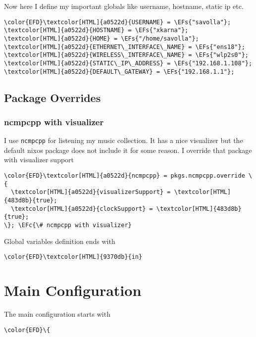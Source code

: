 \documentclass[14pt]{article}
\newcommand{\EFc}[1]{\textcolor{EFc}{#1}} %
\newcommand{\EFs}[1]{\textcolor{EFs}{#1}} %
\begin{document}
Now here I define my important globals like username, hostname, static ip etc.
\begin{Code}
\begin{Verbatim}
\color{EFD}\textcolor[HTML]{a0522d}{USERNAME} = \EFs{"savolla"};
\textcolor[HTML]{a0522d}{HOSTNAME} = \EFs{"xkarna"};
\textcolor[HTML]{a0522d}{HOME} = \EFs{"/home/savolla"};
\textcolor[HTML]{a0522d}{ETHERNET\_INTERFACE\_NAME} = \EFs{"ens18"};
\textcolor[HTML]{a0522d}{WIRELESS\_INTERFACE\_NAME} = \EFs{"wlp2s0"};
\textcolor[HTML]{a0522d}{STATIC\_IP\_ADDRESS} = \EFs{"192.168.1.108"};
\textcolor[HTML]{a0522d}{DEFAULT\_GATEWAY} = \EFs{"192.168.1.1"};
\end{Verbatim}
\end{Code}
\subsection{Package Overrides}
\label{sec:org914a6cd}
\subsubsection{ncmpcpp with visualizer}
\label{sec:org8ff7a56}
I use \texttt{ncmpcpp} for listening my music collection. It has a nice visualizer but the default nixos package does not include it for some reason. I override that package with visualizer support

\begin{Code}
\begin{Verbatim}
\color{EFD}\textcolor[HTML]{a0522d}{ncmpcpp} = pkgs.ncmpcpp.override \{
  \textcolor[HTML]{a0522d}{visualizerSupport} = \textcolor[HTML]{483d8b}{true};
  \textcolor[HTML]{a0522d}{clockSupport} = \textcolor[HTML]{483d8b}{true};
\}; \EFc{\# ncmpcpp with visualizer}
\end{Verbatim}
\end{Code}

Global variables definition ends with
\begin{Code}
\begin{Verbatim}
\color{EFD}\textcolor[HTML]{9370db}{in}
\end{Verbatim}
\end{Code}
\section{Main Configuration}
\label{sec:org178bf27}
The main configuration starts with
\begin{Code}
\begin{Verbatim}
\color{EFD}\{
\end{Verbatim}
\end{Code}
\end{document}
